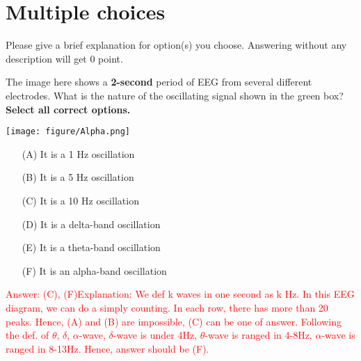 \documentclass[a4 paper]{article}
\begin{document}
\section{Multiple choices}
Please give a brief explanation for option(s) you choose. Answering without any description will get 0 point.
\begin{tcolorbox}[colback=RubineRed!5!white,colframe=RubineRed!75!black]
The image here shows a \textbf{2-second} period of EEG from several different electrodes. What is the nature of the oscillating signal shown in the green box? \textbf{Select all correct options.}
\begin{multicols*}{2}
\begin{center}
    \texttt{[image: figure/Alpha.png]}
\end{center}
\columnbreak
\begin{itemize}
    \item[(A)]It is a 1 Hz oscillation
    \item[(B)]It is a 5 Hz oscillation
    \item[(C)]It is a 10 Hz oscillation
    \item[(D)]It is a delta-band oscillation
    \item[(E)]It is a theta-band oscillation
    \item[(F)]It is an alpha-band oscillation
\end{itemize}
\end{multicols*}
\textcolor{red}{Answer: (C), (F)\newline Explanation: We def k waves in one second as k Hz. In this EEG diagram, we can do a simply counting. In each row, there has more than 20 peaks. Hence, (A) and (B) are impossible, (C) can be one of answer. Following the def. of $\theta$, $\delta$, $\alpha$-wave, $\delta$-wave is under 4Hz, $\theta$-wave is ranged in 4-8Hz, $\alpha$-wave is ranged in 8-13Hz. Hence, answer should be (F). }
\end{tcolorbox}
\end{document}
